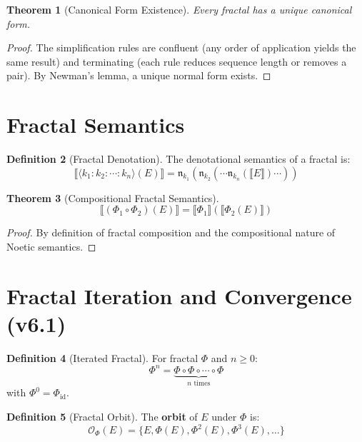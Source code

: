 \documentclass[11pt,twoside,openright]{book}
\theoremstyle{definition}
\newtheorem{definition}{Definition}[chapter]
\theoremstyle{plain}
\newtheorem{theorem}[definition]{Theorem}
\theoremstyle{remark}
\newcommand{\sem}[1]{\llbracket #1 \rrbracket}
\newcommand{\Frac}{\Phi}
\newcommand{\id}{\mathrm{id}}
\begin{document}
\begin{theorem}[Canonical Form Existence]
\label{thm:canonical-exists}
Every fractal has a unique canonical form.
\end{theorem}

\begin{proof}
The simplification rules are confluent (any order of application yields the same result) and terminating (each rule reduces sequence length or removes a pair). By Newman's lemma, a unique normal form exists.
\end{proof}

\section{Fractal Semantics}

\begin{definition}[Fractal Denotation]
\label{def:fractal-denote}
The denotational semantics of a fractal is:
\[
\sem{\langle k_1 : k_2 : \cdots : k_n \rangle(E)} = \mathfrak{n}_{k_1}(\mathfrak{n}_{k_2}(\cdots\mathfrak{n}_{k_n}(\sem{E})\cdots))
\]
\end{definition}

\begin{theorem}[Compositional Fractal Semantics]
\label{thm:fractal-compositional}
\[
\sem{(\Frac_1 \circ \Frac_2)(E)} = \sem{\Frac_1}(\sem{\Frac_2(E)})
\]
\end{theorem}

\begin{proof}
By definition of fractal composition and the compositional nature of Noetic semantics.
\end{proof}

\section{Fractal Iteration and Convergence (v6.1)}

\begin{definition}[Iterated Fractal]
\label{def:iterated-fractal}
For fractal $\Frac$ and $n \geq 0$:
\[
\Frac^n = \underbrace{\Frac \circ \Frac \circ \cdots \circ \Frac}_{n \text{ times}}
\]
with $\Frac^0 = \Frac_{\id}$.
\end{definition}

\begin{definition}[Fractal Orbit]
\label{def:fractal-orbit}
The \textbf{orbit} of $E$ under $\Frac$ is:
\[
\mathcal{O}_\Frac(E) = \{E, \Frac(E), \Frac^2(E), \Frac^3(E), \ldots\}
\]
\end{definition}
\end{document}
